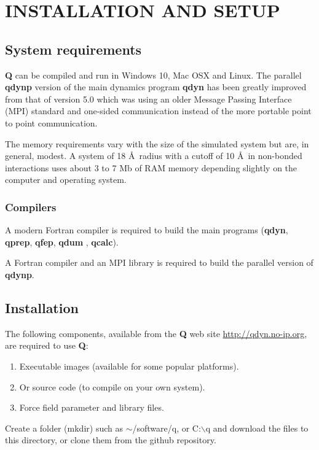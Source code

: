 \documentclass[a4paper,10pt]{article}
\begin{document}
\section{INSTALLATION AND SETUP}
\subsection{System requirements} 
\textbf{Q}  can  be compiled  and run  in Windows  10, Mac  OSX and
Linux.   The  parallel \textbf{qdynp}  version  of  the main  dynamics
program \textbf{qdyn} has  been greatly improved from  that of version
5.0 which was using an  older Message Passing Interface (MPI) standard
and  one-sided communication  instead of  the more  portable point  to
point communication.

The memory requirements vary with the size of the simulated system but
are, in general, modest.  A system of  18 \AA ~radius with a cutoff of
10 \AA ~in non-bonded interactions uses about  3 to 7 Mb of RAM memory
depending slightly on the computer and operating system.

\subsubsection{Compilers} 
A  modern Fortran  compiler is  required  to build  the main  programs
(\textbf{qdyn},   \textbf{qprep},   \textbf{qfep},   \textbf{qdum}   ,
\textbf{qcalc}).

A  Fortran compiler  and  an  MPI library  is  required  to build  the
parallel version of \textbf{qdynp}.

\subsection{Installation}
The following components, available from the \textbf{Q} web site
\url{http://qdyn.no-ip.org}, are required to use \textbf{Q}:
\begin{enumerate}
\item Executable images (available for some popular platforms).
\item Or source code (to compile on your own system).
\item Force field parameter and library files.
\end{enumerate}
Create a folder (mkdir) such as $\sim$/software/q,  or C:$\backslash$q
and download the files to this directory, or clone them from the
github repository.
\end{document}

